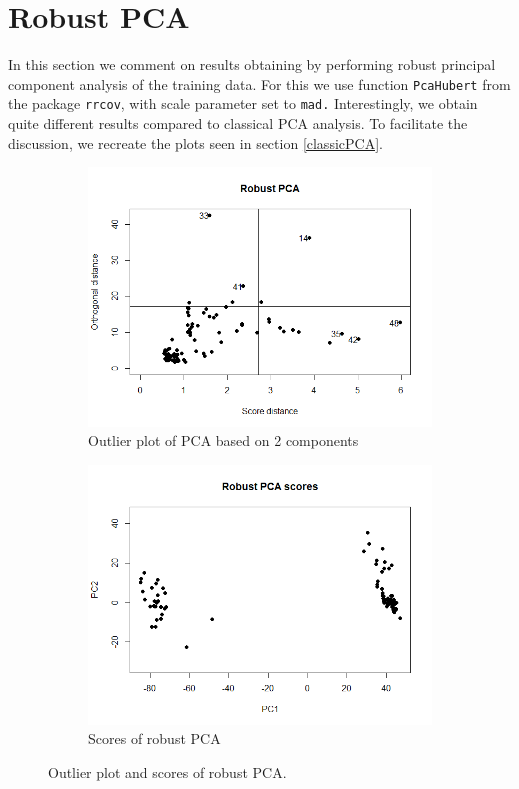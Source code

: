 \documentclass[12pt]{article}
\begin{document}
\section{Robust PCA}
In this section we comment on results obtaining by performing robust principal component analysis of the training data. For this we use function \texttt{PcaHubert} from the
package \texttt{rrcov}, with scale parameter set to \texttt{mad.} Interestingly, we obtain quite different results compared to classical PCA analysis. To facilitate
the discussion, we recreate the plots seen in section \ref{classicPCA}.

\begin{figure}[h!]
  \begin{subfigure}[b]{0.5\linewidth}
      \centering
      \includegraphics[width=\textwidth]{../images/robustPCAoutliers.png}
   \caption{Outlier plot of PCA based on 2 components}\label{fig:robustOutliers}
  \end{subfigure}%
  \begin{subfigure}[b]{0.5\linewidth}
      \centering
   \includegraphics[width=\textwidth]{../images/robustPCAscores.png}
   \caption{Scores of robust PCA}\label{fig:scoresRobust}
  \end{subfigure}%
 \caption{Outlier plot and scores of robust PCA.}
\end{figure} 
\end{document}
